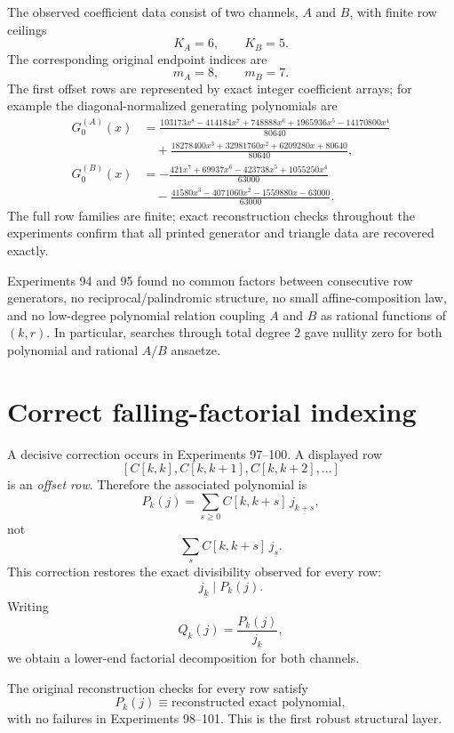 \documentclass[11pt,a4paper]{article}
\newcommand{\fall}[2]{#1_{\underline{#2}}}
\begin{document}
The observed coefficient data consist of two channels, $A$ and $B$, with finite row ceilings
\[
K_A=6,\qquad K_B=5.
\]
The corresponding original endpoint indices are
\[
m_A=8,\qquad m_B=7.
\]
The first offset rows are represented by exact integer coefficient arrays; for example the diagonal-normalized generating polynomials are
\begin{align*}
G^{(A)}_0(x)&=\frac{103173x^8-414184x^7+748888x^6+1965936x^5-14170800x^4}{80640}\\
&\quad+\frac{18278400x^3+32981760x^2+6209280x+80640}{80640},\\
G^{(B)}_0(x)&=-\frac{421x^7+69937x^6-423738x^5+1055250x^4}{63000}\\
&\quad-\frac{41580x^3-4071060x^2-1559880x-63000}{63000}.
\end{align*}
The full row families are finite; exact reconstruction checks throughout the experiments confirm that all printed generator and triangle data are recovered exactly.

Experiments 94 and 95 found no common factors between consecutive row generators, no reciprocal/palindromic structure, no small affine-composition law, and no low-degree polynomial relation coupling $A$ and $B$ as rational functions of $(k,r)$.  In particular, searches through total degree $2$ gave nullity zero for both polynomial and rational $A/B$ ansaetze.

\section{Correct falling-factorial indexing}

A decisive correction occurs in Experiments 97--100.  A displayed row
\[
[C[k,k],C[k,k+1],C[k,k+2],\ldots]
\]
is an \emph{offset row}.  Therefore the associated polynomial is
\begin{equation}
\label{eq:Pk}
P_k(j)=\sum_{s\ge 0} C[k,k+s]\,\fall{j}{k+s},
\end{equation}
not
\[
\sum_s C[k,k+s]\,\fall{j}{s}.
\]
This correction restores the exact divisibility observed for every row:
\begin{equation}
\label{eq:lowerfactor}
\fall{j}{k}\mid P_k(j).
\end{equation}
Writing
\begin{equation}
Q_k(j)=\frac{P_k(j)}{\fall{j}{k}},
\end{equation}
we obtain a lower-end factorial decomposition for both channels.

The original reconstruction checks for every row satisfy
\[
P_k(j)\equiv \text{reconstructed exact polynomial},
\]
with no failures in Experiments 98--101.  This is the first robust structural layer.
\end{document}
